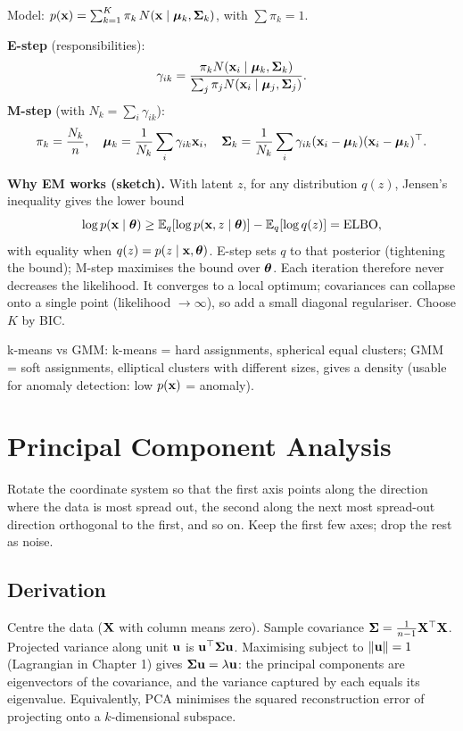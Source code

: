 Model: $p(\mathbf{x})=\sum_{k=1}^K\pi_k\,N(\mathbf{x}\mid\bm{\mu}_k,\bm{\Sigma}_k)$, with $\sum\pi_k=1$.

\textbf{E-step} (responsibilities):
\[\gamma_{ik}=\frac{\pi_kN(\mathbf{x}_i\mid\bm{\mu}_k,\bm{\Sigma}_k)}{\sum_j\pi_jN(\mathbf{x}_i\mid\bm{\mu}_j,\bm{\Sigma}_j)}.\]
\textbf{M-step} (with $N_k=\sum_i\gamma_{ik}$):
\[\pi_k=\frac{N_k}{n},\quad\bm{\mu}_k=\frac1{N_k}\sum_i\gamma_{ik}\mathbf{x}_i,\quad\bm{\Sigma}_k=\frac1{N_k}\sum_i\gamma_{ik}(\mathbf{x}_i-\bm{\mu}_k)(\mathbf{x}_i-\bm{\mu}_k)^\top.\]

\textbf{Why EM works (sketch).} With latent $z$, for any distribution $q(z)$, Jensen's inequality gives the lower bound
\[\log p(\mathbf{x}\mid\bm{\theta})\ge\mathbb{E}_q[\log p(\mathbf{x},z\mid\bm{\theta})]-\mathbb{E}_q[\log q(z)]=\text{ELBO},\]
with equality when $q(z)=p(z\mid\mathbf{x},\bm{\theta})$. E-step sets $q$ to that posterior (tightening the bound); M-step maximises the bound over $\bm{\theta}$. Each iteration therefore never decreases the likelihood. It converges to a local optimum; covariances can collapse onto a single point (likelihood $\to\infty$), so add a small diagonal regulariser. Choose $K$ by BIC.

k-means vs GMM: k-means = hard assignments, spherical equal clusters; GMM = soft assignments, elliptical clusters with different sizes, gives a density (usable for anomaly detection: low $p(\mathbf{x})$ = anomaly).

\section{Principal Component Analysis}
\begin{intuition}
Rotate the coordinate system so that the first axis points along the direction where the data is most spread out, the second along the next most spread-out direction orthogonal to the first, and so on. Keep the first few axes; drop the rest as noise.
\end{intuition}

\subsection{Derivation}
Centre the data ($\mathbf{X}$ with column means zero). Sample covariance $\bm{\Sigma}=\frac1{n-1}\mathbf{X}^\top\mathbf{X}$. Projected variance along unit $\mathbf{u}$ is $\mathbf{u}^\top\bm{\Sigma}\mathbf{u}$. Maximising subject to $\|\mathbf{u}\|=1$ (Lagrangian in Chapter 1) gives $\bm{\Sigma}\mathbf{u}=\lambda\mathbf{u}$: the principal components are eigenvectors of the covariance, and the variance captured by each equals its eigenvalue. Equivalently, PCA minimises the squared reconstruction error of projecting onto a $k$-dimensional subspace.

